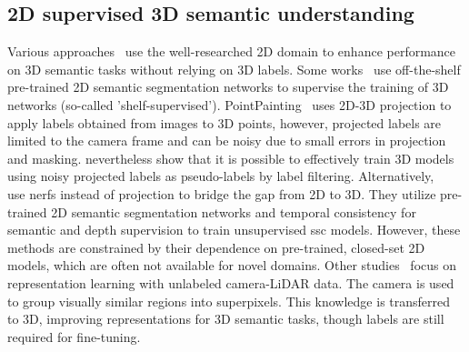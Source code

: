 \subsection{2D supervised 3D semantic understanding}
Various approaches~\cite{hayler_s4c_2024, zhang_occnerf_2023, genova_learning_2021, bultmann_real-time_2023, sautier_image--lidar_2022, mahmoud_self-supervised_2023, liu_segment_2023, vora_pointpainting_2020} use the well-researched 2D domain to enhance performance on 3D semantic tasks without relying on 3D labels.
Some works~\cite{genova_learning_2021, bultmann_real-time_2023, hayler_s4c_2024, reichardt_360_2023} use off-the-shelf pre-trained 2D semantic segmentation networks to supervise the training of 3D networks (so-called 'shelf-supervised'). PointPainting~\cite{vora_pointpainting_2020} uses 2D-3D projection to apply labels obtained from images to 3D points, however, projected labels are limited to the camera frame and can be noisy due to small errors in projection and masking. \cite{genova_learning_2021, reichardt_360_2023} nevertheless show that it is possible to effectively train 3D models using noisy projected labels as pseudo-labels by label filtering. Alternatively, ~\cite{hayler_s4c_2024, zhang_occnerf_2023} use \glspl{nerf} instead of projection to bridge the gap from 2D to 3D.  They utilize pre-trained 2D semantic segmentation networks and temporal consistency for semantic and depth supervision to train unsupervised \gls{ssc} models. 
However, these methods are constrained by their dependence on pre-trained, closed-set 2D models, which are often not available for novel domains.
Other studies~\cite{sautier_image--lidar_2022, mahmoud_self-supervised_2023} focus on representation learning with unlabeled camera-LiDAR data. The camera is used to group visually similar regions into superpixels. This knowledge is transferred to 3D, improving representations for 3D semantic tasks, though labels are still required for fine-tuning. 

